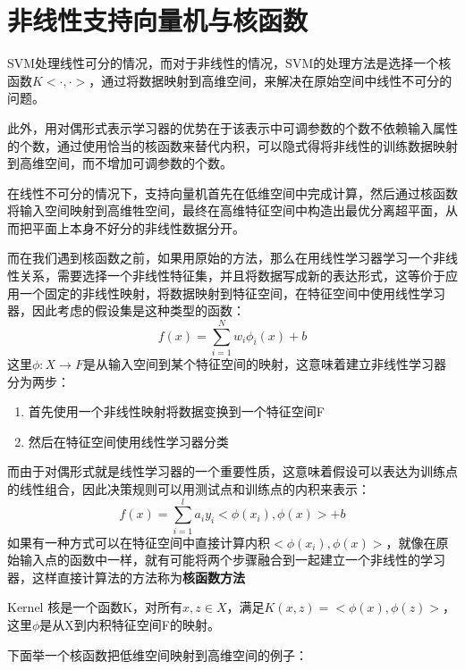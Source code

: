 \section{非线性支持向量机与核函数}
SVM处理线性可分的情况，而对于非线性的情况，SVM的处理方法是选择一个核函数$K<\cdot,\cdot>$，通过将数据映射到高维空间，来解决在原始空间中线性不可分的问题。

此外，用对偶形式表示学习器的优势在于该表示中可调参数的个数不依赖输入属性的个数，通过使用恰当的核函数来替代内积，可以隐式得将非线性的训练数据映射到高维空间，而不增加可调参数的个数。

在线性不可分的情况下，支持向量机首先在低维空间中完成计算，然后通过核函数将输入空间映射到高维牲空间，最终在高维特征空间中构造出最优分离超平面，从而把平面上本身不好分的非线性数据分开。

而在我们遇到核函数之前，如果用原始的方法，那么在用线性学习器学习一个非线性关系，需要选择一个非线性特征集，并且将数据写成新的表达形式，这等价于应用一个固定的非线性映射，将数据映射到特征空间，在特征空间中使用线性学习器，因此考虑的假设集是这种类型的函数：
\begin{equation}
	f(x) = \sum_{i = 1}^Nw_i\phi_i(x) + b
\end{equation}
这里$\phi:X\to F$是从输入空间到某个特征空间的映射，这意味着建立非线性学习器分为两步：
\begin{enumerate}
	\item 首先使用一个非线性映射将数据变换到一个特征空间F
	\item 然后在特征空间使用线性学习器分类 
\end{enumerate}
而由于对偶形式就是线性学习器的一个重要性质，这意味着假设可以表达为训练点的线性组合，因此决策规则可以用测试点和训练点的内积来表示：
\begin{equation}
	f(x) = \sum_{i = 1}^la_iy_i<\phi(x_i),\phi(x)> + b	
\end{equation}
如果有一种方式可以在特征空间中直接计算内积$<\phi(x_i),\phi(x)>$，就像在原始输入点的函数中一样，就有可能将两个步骤融合到一起建立一个非线性的学习器，这样直接计算法的方法称为\textbf{核函数方法}
\begin{definition}{Kernel}{}
	核是一个函数K，对所有$x,z\in X$，满足$K(x,z) = <\phi(x),\phi(z)>$，这里$\phi$是从X到内积特征空间F的映射。
\end{definition}
下面举一个核函数把低维空间映射到高维空间的例子：


